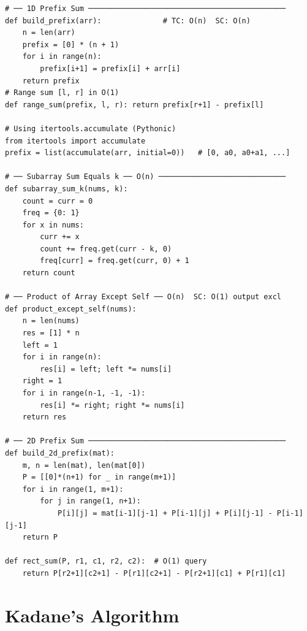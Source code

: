 \documentclass[11pt,a4paper]{report}
\begin{document}
\begin{lstlisting}
# ── 1D Prefix Sum ─────────────────────────────────────────────
def build_prefix(arr):              # TC: O(n)  SC: O(n)
    n = len(arr)
    prefix = [0] * (n + 1)
    for i in range(n):
        prefix[i+1] = prefix[i] + arr[i]
    return prefix
# Range sum [l, r] in O(1)
def range_sum(prefix, l, r): return prefix[r+1] - prefix[l]

# Using itertools.accumulate (Pythonic)
from itertools import accumulate
prefix = list(accumulate(arr, initial=0))   # [0, a0, a0+a1, ...]

# ── Subarray Sum Equals k ── O(n) ─────────────────────────────
def subarray_sum_k(nums, k):
    count = curr = 0
    freq = {0: 1}
    for x in nums:
        curr += x
        count += freq.get(curr - k, 0)
        freq[curr] = freq.get(curr, 0) + 1
    return count

# ── Product of Array Except Self ── O(n)  SC: O(1) output excl
def product_except_self(nums):
    n = len(nums)
    res = [1] * n
    left = 1
    for i in range(n):
        res[i] = left; left *= nums[i]
    right = 1
    for i in range(n-1, -1, -1):
        res[i] *= right; right *= nums[i]
    return res

# ── 2D Prefix Sum ─────────────────────────────────────────────
def build_2d_prefix(mat):
    m, n = len(mat), len(mat[0])
    P = [[0]*(n+1) for _ in range(m+1)]
    for i in range(1, m+1):
        for j in range(1, n+1):
            P[i][j] = mat[i-1][j-1] + P[i-1][j] + P[i][j-1] - P[i-1][j-1]
    return P

def rect_sum(P, r1, c1, r2, c2):  # O(1) query
    return P[r2+1][c2+1] - P[r1][c2+1] - P[r2+1][c1] + P[r1][c1]
\end{lstlisting}

\section{Kadane's Algorithm}
\end{document}
